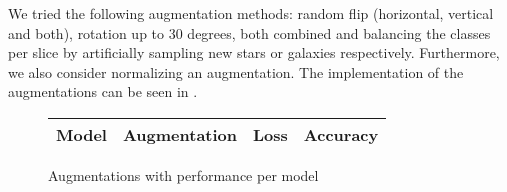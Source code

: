 We tried the following augmentation methods: random flip (horizontal, vertical and both), rotation up to 30 degrees, both combined and balancing the classes per slice by artificially sampling new stars or galaxies respectively. Furthermore, we also consider normalizing an augmentation.
The implementation of the augmentations can be seen in .
\begin{figure}
    \begin{tabularx}{\linewidth}{mmmm}
        \hline
        Model & Augmentation & Loss & Accuracy \\
        \hline
    \end{tabularx}
    \caption{Augmentations with performance per model}
    \label{AugPerformance}
\end{figure}
